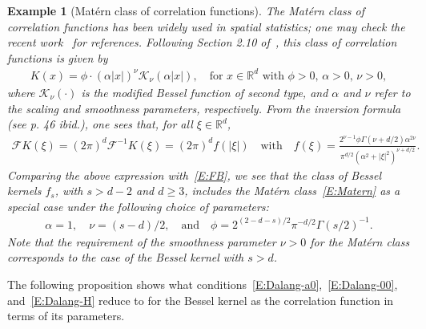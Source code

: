 \documentclass[sn-mathphys]{sn-jnl}%
\renewcommand{\R}{\mathbb{R}}
\numberwithin{equation}{section}
\theoremstyle{thmstyleone}%
\theoremstyle{thmstyletwo}%
\newtheorem{example}{Example}[section]%
\theoremstyle{thmstylethree}%
\begin{document}
\begin{example}[Mat\'ern class of correlation functions]
  The \textit{Mat\'ern class of correlation functions} has been widely used in spatial statistics;
  one may check the recent work~\cite{loh.sun.ea:21:on} for references. Following Section 2.10
  of~\cite{stein:99:interpolation}, this class of correlation functions is given by
  \begin{align}\label{E:Matern}
    K(x) = \phi \cdot (\alpha \lvert x \rvert)^\nu \mathcal{K}_\nu\left(\alpha \lvert x \rvert\right), \quad \text{for
    $x\in\R^d$ with $\phi>0$, $\alpha>0$, $\nu >0$},
  \end{align}
  where $\mathcal{K}_\nu(\cdot)$ is the modified Bessel function of second type, and $\alpha$ and
  $\nu$ refer to the \textit{scaling and smoothness parameters}, respectively. From the inversion
  formula (see p. 46 \textit{ibid.}), one sees that, for all $\xi\in\R^d$,
  \begin{align*}
    \mathcal{F}K(\xi) = (2\pi)^{d} \mathcal{F}^{-1} K(\xi) = (2\pi)^d f(\lvert\xi\rvert)
    \quad \text{with} \quad
    f(\xi) = \frac{2^{\nu-1} \phi \Gamma\left(\nu +d/2\right)\alpha^{2\nu}}{\pi^{d/2}\left(\alpha^2+\lvert\xi\rvert^2\right)^{\nu+d/2}}.
  \end{align*}
  Comparing the above expression with~\eqref{E:FB}, we see that the class of Bessel kernels $f_s$,
  with $s>d-2$ and $d\ge 3$, includes the Mat\'ern class~\eqref{E:Matern} as a special case under
  the following choice of parameters:
  \begin{align*}
    \alpha = 1,\quad \nu = (s-d)/2,\quad \text{and} \quad \phi = 2^{(2-d-s)/2} \pi^{-d/2} \Gamma(s /2)^{-1}.
  \end{align*}
  Note that the requirement of the smoothness parameter $\nu>0$ for the Mat\'ern class corresponds
  to the case of the Bessel kernel with $s>d$.
\end{example}


The following proposition shows what conditions~\eqref{E:Dalang-a0},~\eqref{E:Dalang-00},
and~\eqref{E:Dalang-H} reduce to for the Bessel kernel as the correlation function in terms of its
parameters.
\end{document}
